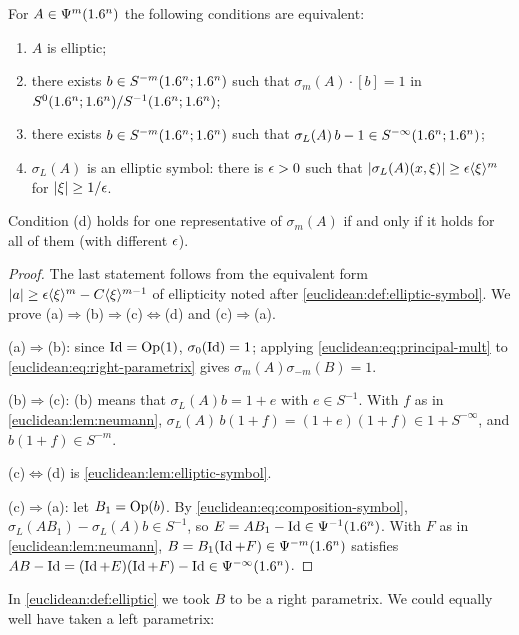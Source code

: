 \begin{theorem}\label{euclidean:thm:elliptic}
  For $A\in\Psi^{m}(1.6^n)$ the following conditions are equivalent:
  \begin{enumerate}[label=\textup{(\alph*)}]
  \item $A$ is elliptic;
  \item there exists $b\in S^{-m}(1.6^n;1.6^n)$ such that
    $\sigma_m(A)\cdot[b]=1$ in $S^0(1.6^n;1.6^n)/S^{-1}(1.6^n;1.6^n)$;
  \item there exists $b\in S^{-m}(1.6^n;1.6^n)$ such that
    $\sigma_L(A)\,b-1\in S^{-\infty}(1.6^n;1.6^n)$;
  \item $\sigma_L(A)$ is an elliptic symbol: there is $\epsilon>0$ such that
    $\lvert \sigma_L(A)(x,\xi)\rvert\ge\epsilon\langle \xi\rangle^m$ for $\lvert \xi\rvert\ge1/\epsilon$.
  \end{enumerate}
  Condition \textup{(d)} holds for one representative of $\sigma_m(A)$ if and
  only if it holds for all of them \textup{(}with different $\epsilon$\textup{)}.
\end{theorem}
\begin{proof}
  The last statement follows from the equivalent form
  $\lvert a\rvert\ge\epsilon\langle \xi\rangle^m-C\langle \xi\rangle^{m-1}$ of ellipticity noted after
  \cref{euclidean:def:elliptic-symbol}. We prove
  (a)$\Rightarrow$(b)$\Rightarrow$(c)$\Leftrightarrow$(d) and
  (c)$\Rightarrow$(a).

  (a)$\Rightarrow$(b): since $\operatorname{Id}=\operatorname{Op}(1)$, $\sigma_0(\operatorname{Id})=1$; applying
  \eqref{euclidean:eq:principal-mult} to \eqref{euclidean:eq:right-parametrix}
  gives $\sigma_m(A)\sigma_{-m}(B)=1$.

  (b)$\Rightarrow$(c): (b) means that $\sigma_L(A)b=1+e$ with
  $e\in S^{-1}$. With $f$ as in \cref{euclidean:lem:neumann},
  $\sigma_L(A)\,b(1+f)=(1+e)(1+f)\in1+S^{-\infty}$, and $b(1+f)\in S^{-m}$.

  (c)$\Leftrightarrow$(d) is \cref{euclidean:lem:elliptic-symbol}.

  (c)$\Rightarrow$(a): let $B_1=\operatorname{Op}(b)$. By
  \eqref{euclidean:eq:composition-symbol},
  $\sigma_L(AB_1)-\sigma_L(A)b\in S^{-1}$, so
  $E=AB_1-\operatorname{Id}\in\Psi^{-1}(1.6^n)$. With $F$ as in \cref{euclidean:lem:neumann},
  $B=B_1(\operatorname{Id}+F)\in\Psi^{-m}(1.6^n)$ satisfies
  $AB-\operatorname{Id}=(\operatorname{Id}+E)(\operatorname{Id}+F)-\operatorname{Id}\in\Psi^{-\infty}(1.6^n)$.
\end{proof}

In \cref{euclidean:def:elliptic} we took $B$ to be a right parametrix. We
could equally well have taken a left parametrix:

